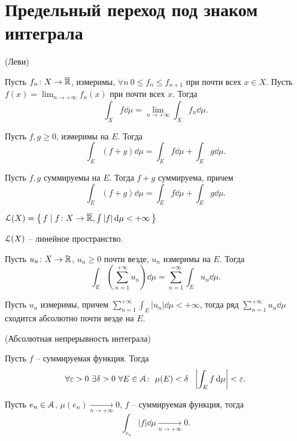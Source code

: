 \section{Предельный переход под знаком интеграла}

\begin{theorem}(Леви)

    Пусть $f_n \colon X \to \overline{\mathbb{R}}$, измеримы, $\forall n~ 0 \leqslant f_n \leqslant f_{n + 1}$
    при почти всех $x \in X$. Пусть $\displaystyle f(x) = \lim_{n \to +\infty}{f_n(x)}$ 
    при почти всех $x$. Тогда
\[
    \int_X{f \dd\mu} = \lim_{n \to +\infty}{\int_X{f_n \dd\mu}}
.\] 
\end{theorem}

\begin{theorem}

    Пусть $f, g \geqslant 0$, измеримы на $E$. Тогда
\[
    \int_E{(f + g) \dd\mu} = \int_E{f \dd\mu} + \int_E{g \dd\mu}
.\] 
\end{theorem}

\begin{corollary}
    
    Пусть $f, g$ суммируемы на $E$. Тогда $f + g$ суммируема, причем
\[
    \int_E{(f + g) \dd\mu} = \int_E{f \dd\mu} + \int_E{g \dd\mu}
.\]
\end{corollary}

\begin{definition}
    $\mathcal{L}(X) = \left\{\, f \mid f \colon X \to \overline{\mathbb{R}}, \int{|f| \,\mathrm{d}\mu} < +\infty \,\right\}$
\end{definition}

\begin{lemma}
    $\mathcal{L}(X)$ -- линейное пространство. 
\end{lemma}

\begin{theorem}
    Пусть $u_n \colon X \to \mathbb{R}$, $u_n \geqslant 0$ почти везде, $u_n$ измеримы на $E$.
    Тогда
\[
    \int_E{\left(\sum_{n = 1}^{+\infty}{u_n}\right) \dd\mu} = \sum_{n = 1}^{+\infty}{\int_E{u_n \dd\mu}}
.\]
\end{theorem}

\begin{corollary}
    Пусть $u_n$ измеримы, причем $\displaystyle \sum_{n = 1}^{+\infty}{\int_E{|u_n| \dd\mu}} < +\infty$,
    тогда ряд $\displaystyle \sum_{n = 1}^{+\infty}{u_n \dd\mu}$ сходится абсолютно почти везде на $E$.
\end{corollary}

\begin{theorem}(Абсолютная непрерывность интеграла)

    Пусть $f$ -- суммируемая функция. Тогда
\[
    \forall \varepsilon > 0~ \exists \delta > 0~ \forall E \in \mathcal{A}\colon~ \mu(E) < \delta
    ~~ \left|\int_E{f \,\mathrm{d}\mu}\right| < \varepsilon
.\] 
\end{theorem}

\begin{corollary}
    Пусть $e_n \in \mathcal{A}$, $\mu(e_n) \xrightarrow[n \to +\infty]{} 0$, $f$ -- суммируемая функция,
    тогда
\[
    \int_{e_n}{|f| \dd\mu} \xrightarrow[n \to +\infty]{} 0
.\] 
\end{corollary}
